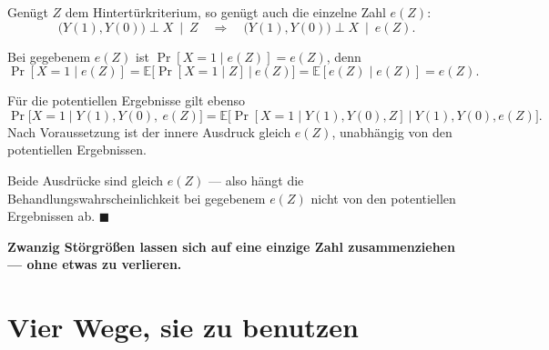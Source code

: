 \begin{merksatz}
Genügt $Z$ dem Hintertürkriterium, so genügt auch die einzelne Zahl $e(Z)$:
\[ \bigl(Y(1),Y(0)\bigr) \perp X \ \mid\ Z \quad\Longrightarrow\quad \bigl(Y(1),Y(0)\bigr) \perp X \ \mid\ e(Z) . \]

 Bei gegebenem $e(Z)$ ist $\Pr[X=1 \mid e(Z)] = e(Z)$, denn
\[ \Pr[X=1 \mid e(Z)] = \mathbb{E}\bigl[\Pr[X=1\mid Z] \ \big|\ e(Z)\bigr] = \mathbb{E}[e(Z)\mid e(Z)] = e(Z) . \]

 Für die potentiellen Ergebnisse gilt ebenso
\[ \Pr\bigl[X=1 \mid Y(1),Y(0),\ e(Z)\bigr] = \mathbb{E}\bigl[\Pr[X=1\mid Y(1),Y(0),Z] \ \big|\ Y(1),Y(0),e(Z)\bigr] . \]
Nach Voraussetzung ist der innere Ausdruck gleich $e(Z)$, unabhängig von den potentiellen Ergebnissen.

 Beide Ausdrücke sind gleich $e(Z)$ --- also hängt die Behandlungswahrscheinlichkeit bei gegebenem $e(Z)$ nicht von den potentiellen Ergebnissen ab. $\blacksquare$

\begin{center}
\begin{minipage}{0.9\textwidth}
\textbf{Zwanzig Störgrößen lassen sich auf eine einzige Zahl zusammenziehen --- ohne etwas zu verlieren.}
\end{minipage}
\end{center}

\begin{center}
\begin{minipage}{0.88\textwidth}
\end{minipage}
\end{center}
\end{merksatz}

\section{Vier Wege, sie zu benutzen}

